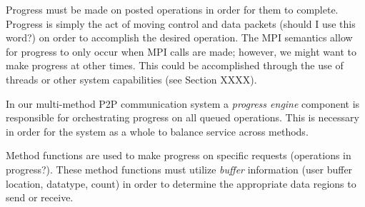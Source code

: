 % 

\begin{comment}
  \emph{is it ok to use the term operation in here?  is there a better one?  we
    could use the term ``request''.  operation isn't too confusing right now,
    but it may be later.  then again, the MPI standard talks about ``posting
    nonblocking operations''...}
\end{comment}

Progress must be made on posted operations in order for them to complete.
Progress is simply the act of moving control and data packets (should I use
this word?) on order to accomplish the desired operation.  The MPI semantics
allow for progress to only occur when MPI calls are made; however, we might
want to make progress at other times.  This could be accomplished through the
use of threads or other system capabilities (see Section XXXX).

\begin{comment}
  \emph{control and data packets: I think we should avoid using packet until
  we start discussion particular method implementations.}
\end{comment}

In our multi-method P2P communication system a \emph{progress engine}
component is responsible for orchestrating progress on all queued operations.  
This is necessary in order for the system as a whole to balance service across
methods.

Method functions are used to make progress on specific requests (operations in
progress?).  These method functions must utilize \emph{buffer} information
(user buffer location, datatype, count) in order to determine the appropriate
data regions to send or receive.

\begin{comment}
  \emph{I am having difficulty agreeing with the first sentence of the above
    paragraph.  Progress must be made on outstanding requests (operations) but
    will the function(s) involved know be informed about specific requests for
    which progress should be made?}
\end{comment}

